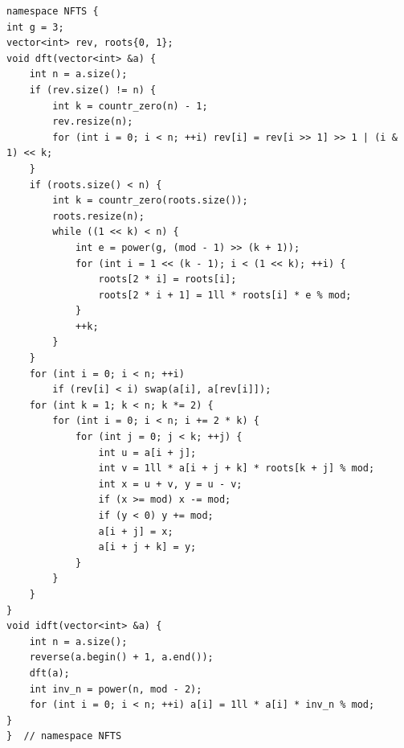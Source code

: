\documentclass[UTF8, twoside]{ctexart}
\begin{document}
\begin{sloppypar}
\begin{lstlisting}[style=cpp]
namespace NFTS {
int g = 3;
vector<int> rev, roots{0, 1};
void dft(vector<int> &a) {
    int n = a.size();
    if (rev.size() != n) {
        int k = countr_zero(n) - 1;
        rev.resize(n);
        for (int i = 0; i < n; ++i) rev[i] = rev[i >> 1] >> 1 | (i & 1) << k;
    }
    if (roots.size() < n) {
        int k = countr_zero(roots.size());
        roots.resize(n);
        while ((1 << k) < n) {
            int e = power(g, (mod - 1) >> (k + 1));
            for (int i = 1 << (k - 1); i < (1 << k); ++i) {
                roots[2 * i] = roots[i];
                roots[2 * i + 1] = 1ll * roots[i] * e % mod;
            }
            ++k;
        }
    }
    for (int i = 0; i < n; ++i)
        if (rev[i] < i) swap(a[i], a[rev[i]]);
    for (int k = 1; k < n; k *= 2) {
        for (int i = 0; i < n; i += 2 * k) {
            for (int j = 0; j < k; ++j) {
                int u = a[i + j];
                int v = 1ll * a[i + j + k] * roots[k + j] % mod;
                int x = u + v, y = u - v;
                if (x >= mod) x -= mod;
                if (y < 0) y += mod;
                a[i + j] = x;
                a[i + j + k] = y;
            }
        }
    }
}
void idft(vector<int> &a) {
    int n = a.size();
    reverse(a.begin() + 1, a.end());
    dft(a);
    int inv_n = power(n, mod - 2);
    for (int i = 0; i < n; ++i) a[i] = 1ll * a[i] * inv_n % mod;
}
}  // namespace NFTS


\end{lstlisting}
\end{sloppypar}
\end{document}
